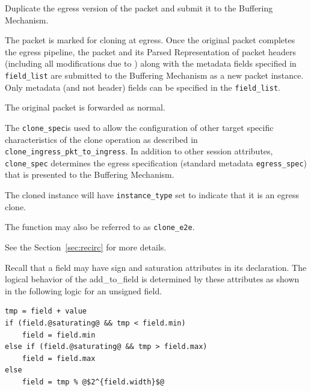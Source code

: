\documentclass[12pt]{article}
\begin{document}
{ %
Duplicate the egress version of the packet and submit it to the Buffering 
Mechanism.
}
{ %
}
{ %
The packet is marked for cloning at egress. Once the original packet completes 
the egress pipeline, the packet and its Parsed Representation of packet headers 
(including all modifications due to \matchaction) along with the metadata 
fields specified in \texttt{field_list} are submitted to the Buffering Mechanism as 
a new packet instance.  {\color{red} Only metadata (and not header) fields can be specified in the \texttt{field_list}.
}

The original packet is forwarded as normal.

The \texttt{clone_spec}is used to allow the configuration of other target specific 
characteristics of the clone operation as described in \texttt{clone_ingress_pkt_to_ingress}. 
In addition to other session attributes, \texttt{clone_spec} determines the egress 
specification (standard metadata \texttt{egress_spec}) that is presented to the 
Buffering Mechanism.

The cloned instance will have \texttt{instance_type} set to indicate that it is an 
egress clone. 

The function may also be referred to as \texttt{clone_e2e}.

See the Section~\ref{sec:recirc} for more details.
}



Recall that a field may have sign and saturation attributes in its declaration. 
The logical behavior of the add_to_field is determined by these attributes 
as shown in the following logic for an unsigned field.

\begin{lstlisting}[keywords={},frame=single,escapechar=\@]
tmp = field + value
if (field.@saturating@ && tmp < field.min)
    field = field.min
else if (field.@saturating@ && tmp > field.max)
    field = field.max
else
    field = tmp % @$2^{field.width}$@
\end{lstlisting}
\end{document}
